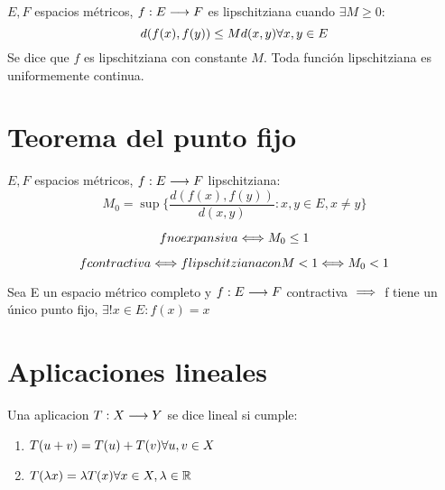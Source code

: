 \begin{definicion}
    $E,F$ espacios métricos, $f:E \longrightarrow F$ es lipschitziana cuando $\exists M\geq 0:$ 
    $$d(f(x),f(y)) \leq Md(x,y) \\\forall x,y \in E$$
    Se dice que $f$ es lipschitziana con constante $M$. 
    Toda función lipschitziana es uniformemente continua.
\end{definicion}

\section{Teorema del punto fijo}

\begin{definicion}
    $E,F$ espacios métricos, $f:E \longrightarrow F$ lipschitziana:
    $$M_0 = \sup\{\frac{d(f(x),f(y))}{d(x,y)} : x,y \in E, x\neq y\}$$
\end{definicion}

\begin{definicion}
    $$f\\no\\expansiva \Longleftrightarrow M_0 \leq 1$$
\end{definicion}

\begin{definicion}
    $$f\\contractiva \Longleftrightarrow f \\ lipschitziana \\ con \\ M < 1 \Longleftrightarrow M_0 < 1$$
\end{definicion}

\begin{teo}
    Sea E un espacio métrico completo y $f:E \longrightarrow F$ contractiva $\implies$ f tiene un único punto fijo,  $\exists! x \in E : f(x) = x$
\end{teo}

\section{Aplicaciones lineales}

\begin{definicion}
    Una aplicacion $T:X\longrightarrow Y$ se dice lineal si cumple:
    \begin{enumerate}
        \item $T(u+v) = T(u) + T(v) \\\forall u,v \in X$
        \item $T(\lambda x) = \lambda T(x) \\\forall x \in X, \lambda \in \mathbb R$
    \end{enumerate}
\end{definicion}

